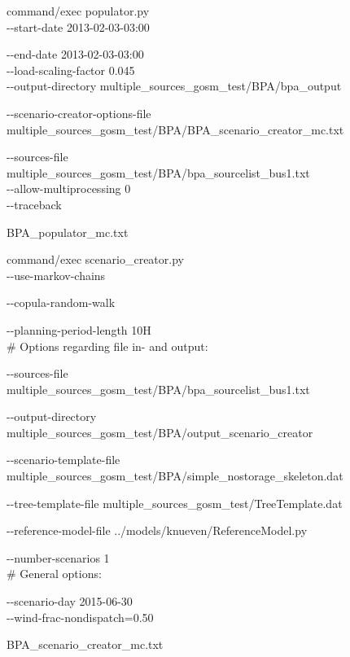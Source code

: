 \begin{figure}[H]
	\begin{framed}
		command/exec populator.py\\
		
		-{}-start-date 2013-02-03-03:00
		
		-{}-end-date 2013-02-03-03:00\\
		
		-{}-load-scaling-factor 0.045\\
		
		-{}-output-directory multiple\_sources\_gosm\_test/BPA/bpa\_output
		
		-{}-scenario-creator-options-file multiple\_sources\_gosm\_test/BPA/BPA\_scenario\_creator\_mc.txt
		
		-{}-sources-file multiple\_sources\_gosm\_test/BPA/bpa\_sourcelist\_bus1.txt\\
		
		-{}-allow-multiprocessing 0\\
		
		-{}-traceback
	\end{framed}
	\caption{BPA\_populator\_mc.txt}
\end{figure}

\begin{figure}[H]
	\begin{framed}
		command/exec scenario\_creator.py\\
		
		-{}-use-markov-chains
		
		-{}-copula-random-walk
		
		-{}-planning-period-length 10H\\
		
		\# Options regarding file in- and output:
		
		-{}-sources-file multiple\_sources\_gosm\_test/BPA/bpa\_sourcelist\_bus1.txt
		
		-{}-output-directory multiple\_sources\_gosm\_test/BPA/output\_scenario\_creator
		
		-{}-scenario-template-file multiple\_sources\_gosm\_test/BPA/simple\_nostorage\_skeleton.dat
		
		-{}-tree-template-file multiple\_sources\_gosm\_test/TreeTemplate.dat
	
		-{}-reference-model-file ../models/knueven/ReferenceModel.py
		
		-{}-number-scenarios 1\\
		
		\# General options:
		
		-{}-scenario-day 2015-06-30\\
		
		-{}-wind-frac-nondispatch=0.50
	\end{framed}
	\caption{BPA\_scenario\_creator\_mc.txt}
\end{figure}

